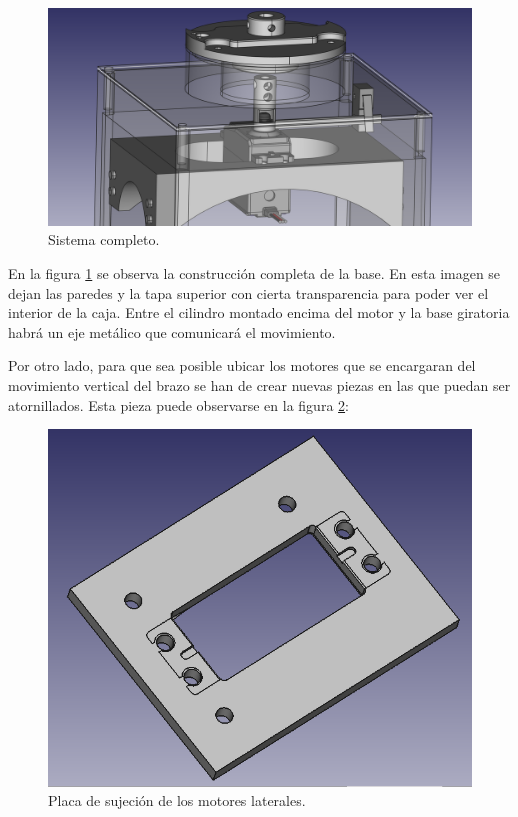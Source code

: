 \begin{figure}[H]
    \centering
    \includegraphics[width=.9\linewidth]{pictures/SistemaCompleto.png}
    \caption{Sistema completo.}
    \label{fig:sistema_completo}
\end{figure}

En la figura \ref{fig:sistema_completo} se observa la construcción completa de la base. En esta imagen se dejan las paredes y la tapa superior con cierta transparencia para poder ver el interior de la caja. Entre el cilindro montado encima del motor y la base giratoria habrá un eje metálico que comunicará el movimiento.

Por otro lado, para que sea posible ubicar los motores que se encargaran del movimiento vertical del brazo se han de crear nuevas piezas en las que puedan ser atornillados. Esta pieza puede observarse en la figura \ref{fig:pletina_sujecion_motor}:

\begin{figure}[H]
    \centering
    \includegraphics[width=.9\linewidth]{pictures/pletina_motor.png}
    \caption{Placa de sujeción de los motores laterales.}
    \label{fig:pletina_sujecion_motor}
\end{figure}

